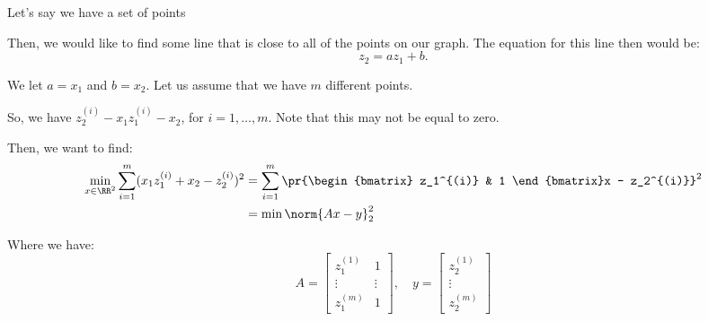 \documentclass[openany]{book}
\begin{document}
\begin{example}
	Let's say we have a set of points
	
	
	Then, we would like to find some line that is close to all of the points on our graph. The equation for this line then would be:
	\begin{equation*}
		z_2 = az_1 + b.
	\end{equation*}

	We let $a = x_1$ and $b = x_2$. Let us assume that we have $m$ different points.
	
	So, we have $z_2^{(i)} - x_1z_1^{(i)} - x_2$, for $i = 1, \ldots, m$. Note that this may not be equal to zero.
	
	Then, we want to find:
	\begin{align*}
		\min_{x \in \RR^{2}} \sum_{i=1}^{m} (x_1z_1^{(i)} + x_2 - z_2^{(i)})^{2} &= \sum_{i = 1}^{m} \pr{\begin{bmatrix}
				z_1^{(i)} & 1
		\end{bmatrix}x - z_2^{(i)}}^{2} \\
		&= \min \norm{Ax-y}_2^{2}
	\end{align*}

	Where we have:
	\begin{equation*}
		A = \begin{bmatrix}
			z_1^{(1)} & 1 \\
			\vdots & \vdots \\
			z_1^{(m)} & 1
		\end{bmatrix}, \quad
		y = \begin{bmatrix}
			z_2^{(1)} \\ \vdots \\ z_2^{(m)}
		\end{bmatrix}
	\end{equation*}
\end{example}
\end{document}
